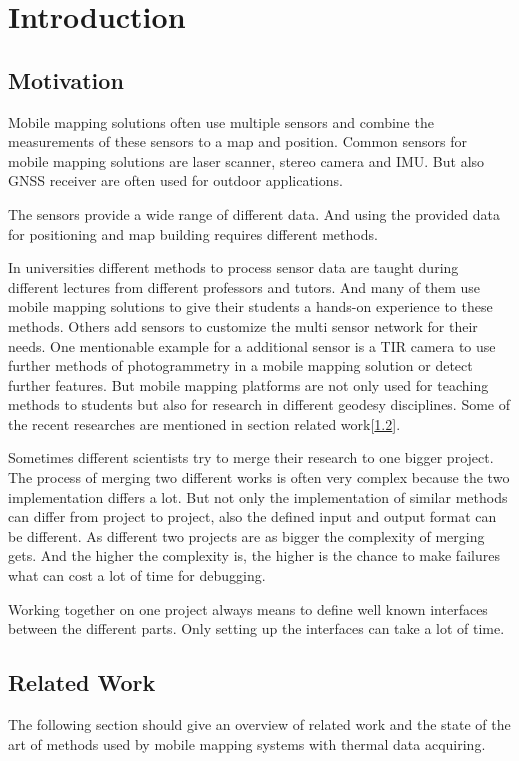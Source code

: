 \chapter{Introduction}\label{ch:introduction}

\section{Motivation}\label{sec:motivation}

Mobile mapping solutions often use multiple sensors and combine the measurements of these sensors to a map and position.
Common sensors for mobile mapping solutions are laser scanner, stereo camera and \ac{IMU}.
But also \ac{GNSS} receiver are often used for outdoor applications.

The sensors provide a wide range of different data.
And using the provided data for positioning and map building requires different methods.

In universities different methods to process sensor data are taught during different lectures from different professors and tutors.
And many of them use mobile mapping solutions to give their students a hands-on experience to these methods.
Others add sensors to customize the multi sensor network for their needs.
One mentionable example for a additional sensor is a \ac{TIR} camera to use further methods of photogrammetry in a mobile mapping solution or detect further features.
But mobile mapping platforms are not only used for teaching methods to students but also for research in different geodesy disciplines.
Some of the recent researches are mentioned in section related work[\ref{sec:related-work}].

Sometimes different scientists try to merge their research to one bigger project.
The process of merging two different works is often very complex because the two implementation differs a lot.
But not only the implementation of similar methods can differ from project to project, also the defined input and output format can be different.
As different two projects are as bigger the complexity of merging gets.
And the higher the complexity is, the higher is the chance to make failures what can cost a lot of time for debugging.

Working together on one project always means to define well known interfaces between the different parts.
Only setting up the interfaces can take a lot of time.

\section{Related Work}\label{sec:related-work}
The following section should give an overview of related work and the state of the art of methods used by mobile mapping systems with thermal data acquiring.

